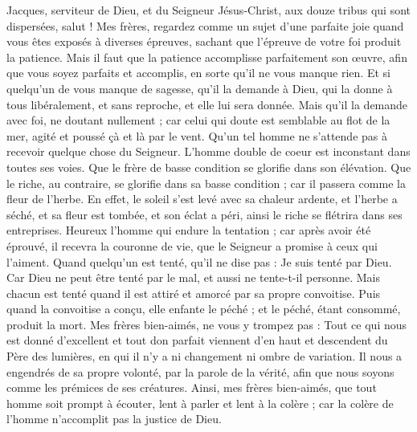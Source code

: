 \begin{multicols}{2}
\VerseOne{}Jacques, serviteur de Dieu, et du Seigneur Jésus-Christ, aux douze tribus qui sont dispersées, salut !
Mes frères, regardez comme un sujet d'une parfaite joie quand vous êtes exposés à diverses épreuves,
sachant que l'épreuve de votre foi produit la patience.
Mais il faut que la patience accomplisse parfaitement son œuvre, afin que vous soyez parfaits et accomplis, en sorte qu'il ne vous manque rien.
Et si quelqu'un de vous manque de sagesse, qu'il la demande à Dieu, qui la donne à tous libéralement, et sans reproche, et elle lui sera donnée.
Mais qu'il la demande avec foi, ne doutant nullement ; car celui qui doute est semblable au flot de la mer, agité et poussé çà et là par le vent.
Qu'un tel homme ne s'attende pas à recevoir quelque chose du Seigneur.
L'homme double de coeur est inconstant dans toutes ses voies.
Que le frère de basse condition se glorifie dans son élévation.
Que le riche, au contraire, se glorifie dans sa basse condition ; car il passera comme la fleur de l'herbe.
En effet, le soleil s'est levé avec sa chaleur ardente, et l'herbe a séché, et sa fleur est tombée, et son éclat a péri, ainsi le riche se flétrira dans ses entreprises.
Heureux l'homme qui endure la tentation ; car après avoir été éprouvé, il recevra la couronne de vie, que le Seigneur a promise à ceux qui l'aiment.
Quand quelqu'un est tenté, qu'il ne dise pas : Je suis tenté par Dieu. Car Dieu ne peut être tenté par le mal, et aussi ne tente-t-il personne.
Mais chacun est tenté quand il est attiré et amorcé par sa propre convoitise.
Puis quand la convoitise a conçu, elle enfante le péché ; et le péché, étant consommé, produit la mort.
Mes frères bien-aimés, ne vous y trompez pas :
Tout ce qui nous est donné d'excellent et tout don parfait viennent d'en haut et descendent du Père des lumières, en qui il n'y a ni changement ni ombre de variation.
Il nous a engendrés de sa propre volonté, par la parole de la vérité, afin que nous soyons comme les prémices de ses créatures.
Ainsi, mes frères bien-aimés, que tout homme soit prompt à écouter, lent à parler et lent à la colère ;
car la colère de l'homme n'accomplit pas la justice de Dieu.

\end{multicols}
